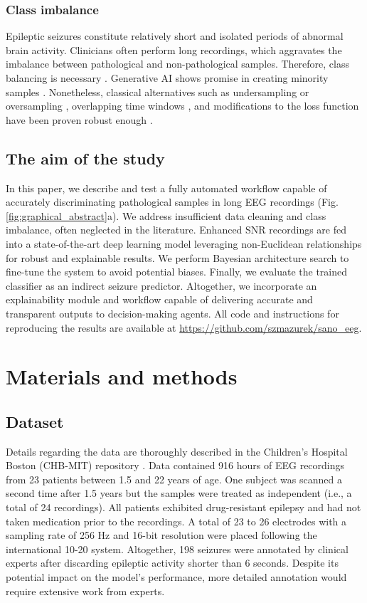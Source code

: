 \documentclass[a4paper,fleqn]{cas-sc}
\begin{document}
\subsubsection*{Class imbalance}

Epileptic seizures constitute relatively short and isolated periods of abnormal brain activity. Clinicians often perform long recordings, which aggravates the imbalance between pathological and non-pathological samples. Therefore, class balancing is necessary \cite{abd2013imbalance}. Generative AI shows promise in creating minority samples \cite{chao2021GanAug}. Nonetheless, classical alternatives such as undersampling or oversampling \cite{JiaEfficientGraphConv}, overlapping time windows \cite{ZhaoGraphFocalLoss,he2022gatblstm}, and modifications to the loss function \cite{ZhaoGraphFocalLoss} have been proven robust enough \cite{MazurekPreprocessing}.

\subsection{The aim of the study}

In this paper, we describe and test a fully automated workflow capable of accurately discriminating pathological samples in long EEG recordings (Fig. \ref{fig:graphical_abstract}a). We address insufficient data cleaning and class imbalance, often neglected in the literature. Enhanced SNR recordings are fed into a state-of-the-art deep learning model leveraging non-Euclidean relationships for robust and explainable results. We perform Bayesian architecture search to fine-tune the system to avoid potential biases. Finally, we evaluate the trained classifier as an indirect seizure predictor. Altogether, we incorporate an explainability module and workflow capable of delivering accurate and transparent outputs to decision-making agents. All code and instructions for reproducing the results are available at \url{https://github.com/szmazurek/sano_eeg}.

\section{Materials and methods}

\subsection{Dataset}
Details regarding the data are thoroughly described in the Children's Hospital Boston (CHB-MIT) repository \cite{ShoebChbmit}. Data contained 916 hours of EEG recordings from 23 patients between 1.5 and 22 years of age. One subject was scanned a second time after 1.5 years but the samples were treated as independent (i.e., a total of 24 recordings). All patients exhibited drug-resistant epilepsy and had not taken medication prior to the recordings. A total of 23 to 26 electrodes with a sampling rate of 256 Hz and 16-bit resolution were placed following the international 10-20 system. Altogether, 198 seizures were annotated by clinical experts after discarding epileptic activity shorter than 6 seconds. Despite its potential impact on the model's performance, more detailed annotation would require extensive work from experts. 
\end{document}
